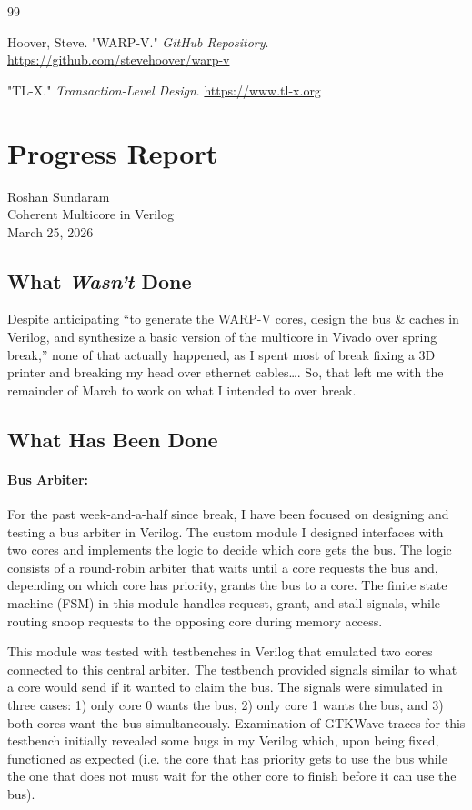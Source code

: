 \documentclass[10pt]{article}
\begin{document}
\clearpage 


\begin{thebibliography}{99}

Hoover, Steve. "WARP-V." \textit{GitHub Repository}.
\url{https://github.com/stevehoover/warp-v}

"TL-X." \textit{Transaction-Level Design}.
\url{https://www.tl-x.org}

\end{thebibliography}


\clearpage 

\section*{Progress Report}
Roshan Sundaram \\
Coherent Multicore in Verilog \\
March 25, 2026

\subsection*{What \textit{Wasn't} Done}
Despite anticipating ``to generate the WARP-V cores, design the bus \& caches in Verilog, and synthesize a basic version of the multicore in Vivado over spring break,'' none of that actually happened, as I spent most of break fixing a 3D printer and breaking my head over ethernet cables\dots. So, that left me with the remainder of March to work on what I intended to over break. 

\subsection*{What Has Been Done}
\paragraph{Bus Arbiter:} For the past week-and-a-half since break, I have been focused on designing and testing a bus arbiter in Verilog. The custom module I designed interfaces with two cores and implements the logic to decide which core gets the bus. The logic consists of a round-robin arbiter that waits until a core requests the bus and, depending on which core has priority, grants the bus to a core. The finite state machine (FSM) in this module handles request, grant, and stall signals, while routing snoop requests to the opposing core during memory access. 

This module was tested with testbenches in Verilog that emulated two cores connected to this central arbiter. The testbench provided signals similar to what a core would send if it wanted to claim the bus. The signals were simulated in three cases: 1) only core 0 wants the bus, 2) only core 1 wants the bus, and 3) both cores want the bus simultaneously. Examination of GTKWave traces for this testbench initially revealed some bugs in my Verilog which, upon being fixed, functioned as expected (i.e. the core that has priority gets to use the bus while the one that does not must wait for the other core to finish before it can use the bus). 
\end{document}

